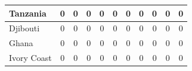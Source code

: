 \documentclass[12pt]{article}  %
\begin{document}
\begin{subappendices}
\begin{longtable}{|l|c|c|c|c|c|c|c|c|c|c|}
	\hline
	Tanzania                                                       & 0                                                                      & 0                                                                      & 0                                                                      & 0                                                                      & 0                                                                      & 0                                                                      & 0                         & 0                           & 0                           & 0                           \\ 
	\hline
	Djibouti                                                       & 0                                                                      & 0                                                                      & 0                                                                      & 0                                                                      & 0                                                                      & 0                                                                      & 0                         & 0                           & 0                           & 0                           \\ 
	\hline
	Ghana                                                          & 0                                                                      & 0                                                                      & 0                                                                      & 0                                                                      & 0                                                                      & 0                                                                      & 0                         & 0                           & 0                           & 0                           \\ 
	\hline
	Ivory Coast                                                    & 0                                                                      & 0                                                                      & 0                                                                      & 0                                                                      & 0                                                                      & 0                                                                      & 0                         & 0                           & 0                           & 0                           \\ 

\end{longtable}
\end{subappendices}
\end{document}
